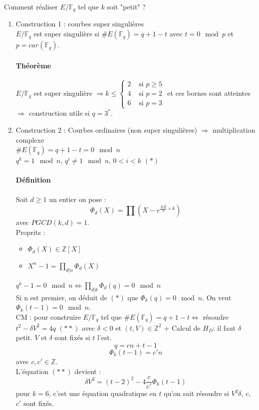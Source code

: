 \documentclass[12pt,a4paper]{report}
\begin{document}
Comment réaliser $E/\mathbb{F}_q$ tel que $k$ soit "petit" ?
\begin{enumerate}
\item Construction 1 : courbes super singulières\\
$E/\mathbb{F}_q$ est super singulière si $\# E(\mathbb{F}_q) = q+1-t$ avec $t=0 \mod p$ et $p = car(\mathbb{F}_q)$.
\paragraph{Théorème\\}
$E/\mathbb{F}_q$ est super singulière $\Rightarrow k \leqslant \left\{\begin{array}{ll}
 2 & \mbox{ si } p \geqslant 5 \\
 4 & \mbox{ si }p=2 \\
 6 & \mbox{ si } p=3 \end{array}\right. $
 et ces bornes sont atteintes $\Rightarrow $ construction utile si $q=3^*$.
 \item Construction 2 : Courbes ordinaires (non super singulières) $\Rightarrow$ multiplication complexe \\
$\#E(\mathbb{F}_q) = q+1-t = 0 \mod n$\\
$ q^k = 1 \mod n$, $q^i \neq 1 \mod n$, $0 < i < k $  $(*)$
\paragraph{Définition\\}
Soit $d\geqslant 1$ un entier on pose :
$$ \Phi_d(X) = \prod \left(X-e^{\frac{2i\Pi}{d}\times k}\right)$$ avec $PGCD(k,d)=1$.\\
Proprits :
\begin{itemize}
\item $\Phi_d(X) \in \mathbb{Z}[X]$
\item $X^n-1 = \prod_{d|n} \Phi_d(X) $
\end{itemize}
$q^k -1 = 0 \mod n \Leftrightarrow \prod_{d|k} \Phi_d(q) = 0 \mod n$\\
Si n est premier, on déduit de $(*)$ que $\Phi_k(q) = 0 \mod n $. On veut $\Phi_k(t-1)=0 \mod n$.\\
CM : pour construire $E/\mathbb{F}_q$ tel que $\#E(\mathbb{F}_q) = q+1-t \Longleftrightarrow $ résoudre $t^2-\delta V^2 = 4q$ $(**)$ avec $\delta <0$ et $(t,V) \in \mathbb{Z}^2$ $ + $ Calcul de $H_D$: il faut $\delta$ petit. $V$ et $\delta$ sont fixés si $t$ l'est.\\
$$ q = cn + t-1 $$
$$ \Phi_k(t-1)=c'n$$
avec $c,c' \in \mathbb{Z}$.\\
L'équation $(**)$ devient :
$$ \delta V^2 = (t-2)^2 - 4\frac{c}{c'} \Phi_k(t-1)$$
pour $k=6$, c'est une équation quadratique en $t$ qu'on sait résoudre si $V^2\delta$, $c$, $c'$ sont fixés.
\end{enumerate}
\end{document}
